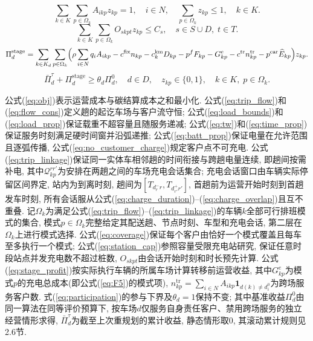 \documentclass{setp-new}
\begin{document}
\begin{equation}
\sum_{k\in K}\sum_{p\in\Omega_k}A_{ikp}z_{kp}=1,\quad i\in N,\quad
\sum_{p\in\Omega_k}z_{kp}\le1,\quad k\in K.
\label{eq:coverage}
\end{equation}
\begin{equation}
\sum_{k\in K}\sum_{p\in\Omega_k}O_{skpt}z_{kp}\le C_s,\quad s\in S\cup D,\;t\in T.
\label{eq:station_cap}
\end{equation}
\begin{equation}
\Pi_d^{\mathrm{stage}}=\sum_{k\in K_d}\sum_{p\in\Omega_k}
\Bigl(\rho\sum_{i\in N}q_iA_{ikp}
-c^{\mathrm{fix}}n_{kp}-c_k^{\mathrm{km}}D_{kp}-p^fF_{kp}-G_{kp}^{e}
-c^{\mathrm{tr}}n_{kp}^{\mathrm{tr}}-p^{\mathrm{car}}\widehat E_{kp}\Bigr)z_{kp}.
\label{eq:stage_profit}
\end{equation}
\begin{equation}
\bar\Pi_d^\tau+\Pi_d^{\mathrm{stage}}\ge\theta_d\Pi_d^0,\quad d\in D,\quad
z_{kp}\in\{0,1\},\quad k\in K,\;p\in\Omega_k.
\label{eq:participation}
\end{equation}

公式(\ref{eq:obj})表示运营成本与碳结算成本之和最小化.
公式(\ref{eq:trip_flow})和(\ref{eq:flow_cons})定义趟的起讫车场与客户流守恒;
公式(\ref{eq:load_bounds})和(\ref{eq:load_prop})保证载重不超容量且随服务递减;
公式(\ref{eq:tw})和(\ref{eq:time_prop})保证服务时刻满足硬时间窗并沿弧递推;
公式(\ref{eq:batt_prop})保证电量在允许范围且逐弧传播, 公式(\ref{eq:no_customer_charge})规定客户点不可充电.
公式(\ref{eq:trip_linkage})保证同一实体车相邻趟的时间衔接与跨趟电量连续, 即趟间按需补电,
其中$\mathcal Q_{kp}^{rr'}$为安排在两趟之间的车场充电会话集合;
充电会话窗口由车辆实际停留区间界定, 站内为到离时刻, 趟间为$[T_{d_r^-r},T_{d_{r'}^+r'}]$,
首趟前为运营开始时刻到首趟发车时刻, 所有会话服从公式(\ref{eq:charge_duration})--(\ref{eq:charge_overlap})且互不重叠.
记$\Omega_k$为满足公式(\ref{eq:trip_flow})--(\ref{eq:trip_linkage})的车辆$k$全部可行排班模式的集合,
模式$p\in\Omega_k$完整给定其配送趟、节点时刻、车型和充电会话, 第二层在$\Omega_k$上进行模式选择.
公式(\ref{eq:coverage})保证每个客户由恰好一个模式覆盖且每车至多执行一个模式;
公式(\ref{eq:station_cap})参照容量受限充电站研究\cite{ref:12,ref:13},
保证任意时段站点并发充电数不超过桩数, $O_{skpt}$由会话开始时刻和时长预先计算.
公式(\ref{eq:stage_profit})按实际执行车辆的所属车场计算转移前运营收益,
其中$G_{kp}^{e}$为模式$p$的充电总成本(即公式(\ref{eq:F5})的模式项),
$n_{kp}^{\mathrm{tr}}=\sum_{i\in N}A_{ikp}\mathbf 1_{d(k)\neq d_i^0}$为跨场服务客户数.
式(\ref{eq:participation})的参与下界及$\theta_d=1$保持不变;
其中基准收益$\Pi_d^0$由同一算法在同等评价预算下,
按车场$d$仅服务自身责任客户、禁用跨场服务的独立经营情形求得,
$\bar\Pi_d^\tau$为截至上次重规划的累计收益, 静态情形取0, 其滚动累计规则见2.6节.
\end{document}
